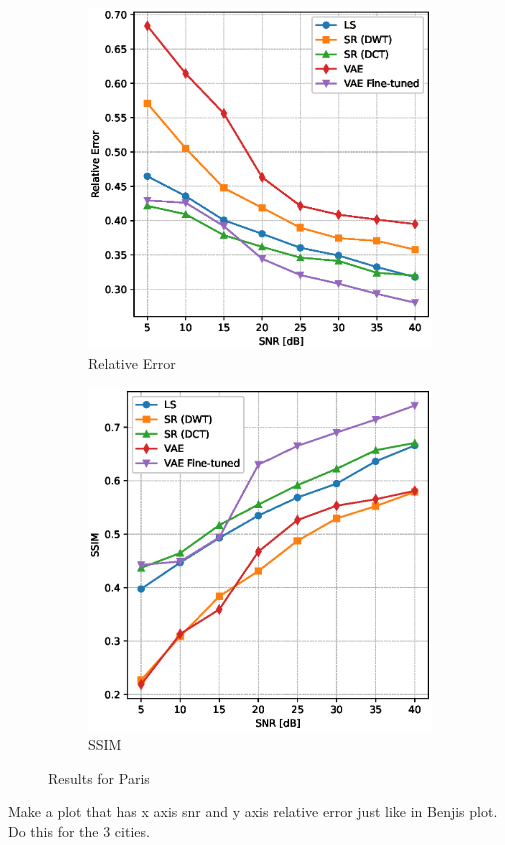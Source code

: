 \begin{figure}
    \centering
    \begin{subfigure}[b]{0.49\textwidth}
        \includegraphics[width=\textwidth]{figures/06_results/snr_plots/paris_relative_error.eps}
        \caption{Relative Error}
    \end{subfigure}
    \begin{subfigure}[b]{0.49\textwidth}
        \includegraphics[width=\textwidth]{figures/06_results/snr_plots/paris_ssim.eps}
        \caption{SSIM}
    \end{subfigure}
    \caption{Results for Paris}
\end{figure}
Make a plot that has x axis snr and y axis relative error just like in Benjis plot.
Do this for the 3 cities.

